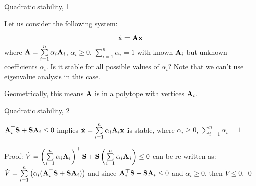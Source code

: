 \documentclass{beamer}
\begin{document}
	
	
	
	
	\begin{frame}{Quadratic stability, 1}
		\begin{flushleft}
			
			Let us consider the following system:
			
			\begin{equation}
				\dot{\mathbf{x}} = \mathbf{A}\mathbf{x}
			\end{equation}
			where $\mathbf{A} = \sum\limits_{i=1}^{n} \alpha_i \mathbf{A}_i$, $\alpha_i \geq 0$, $\sum\limits_{i=1}^{n} \alpha_i = 1$ with known $\mathbf{A}_i$ but unknown coefficients $\alpha_i$. Is it stable for all possible values of $\alpha_i$? Note that we can't use eigenvalue analysis in this case.
			
			\bigskip
			
			Geometrically, this means $\mathbf{A}$ is in a polytope with vertices $\mathbf{A}_i$.
			
		\end{flushleft}
	\end{frame}
	
	
	
	\begin{frame}{Quadratic stability, 2}
		\begin{flushleft}
			
			\begin{theorem}
				$\mathbf{A}_i^\top \mathbf{S} + \mathbf{S} \mathbf{A}_i \leq 0$ implies $\dot{\mathbf{x}} = \sum\limits_{i=1}^{n} \alpha_i \mathbf{A}_i \mathbf{x}$ is stable, where $\alpha_i \geq 0$, $\sum\limits_{i=1}^{n} \alpha_i = 1$
			\end{theorem}
			
			\bigskip
			
			Proof: $\dot V = \left(\sum\limits_{i=1}^{n} \alpha_i \mathbf{A}_i \right)^\top \mathbf{S} + \mathbf{S} 
			\left( \sum\limits_{i=1}^{n} \alpha_i \mathbf{A}_i \right) \leq 0$ can be re-written as: 
			$\dot V = \sum\limits_{i=1}^{n} \left( \alpha_i (\mathbf{A}_i^\top \mathbf{S} + \mathbf{S} \mathbf{A}_i) \right) $ and since $\mathbf{A}_i^\top \mathbf{S} + \mathbf{S} \mathbf{A}_i \leq 0$ and $\alpha_i \geq 0$, then $\dot V \leq 0$. \qed
			
		\end{flushleft}
	\end{frame}
	
	
	
\end{document}
